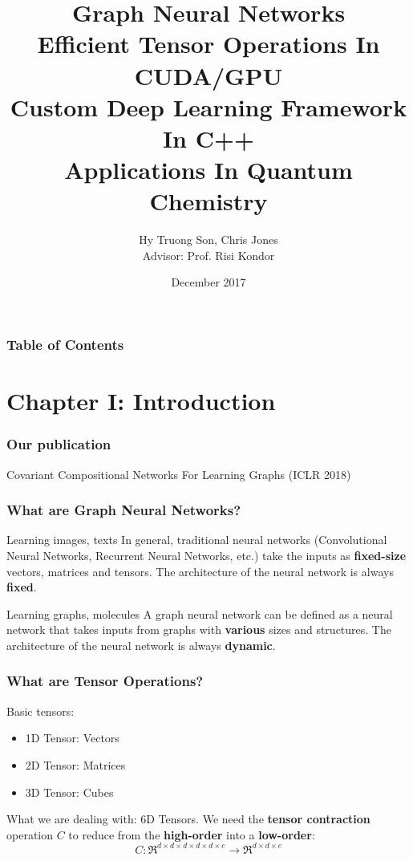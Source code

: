 \documentclass{beamer}
\title[Graph Neural Networks]{Graph Neural Networks \\ Efficient Tensor Operations In CUDA/GPU \\ Custom Deep Learning Framework In C++ \\ Applications In Quantum Chemistry}
\author[Hy et al.]{Hy Truong Son, Chris Jones \\ Advisor: Prof. Risi Kondor}
\institute[UChicago]{The University of Chicago}
\date{December 2017}
\begin{document}

\frame{\titlepage}

\begin{frame}
\frametitle{Table of Contents}
\tableofcontents
\end{frame}

\section{Chapter I: Introduction}

\begin{frame}
\frametitle{Our publication}
Covariant Compositional Networks For Learning Graphs (ICLR 2018)
\end{frame}

\begin{frame}
\frametitle{What are Graph Neural Networks?}
\begin{block}{Learning images, texts}
In general, traditional neural networks (Convolutional Neural Networks, Recurrent Neural Networks, etc.) take the inputs as \textbf{fixed-size} vectors, matrices and tensors. The architecture of the neural network is always \textbf{fixed}.
\end{block}
\begin{alertblock}{Learning graphs, molecules}
A graph neural network can be defined as a neural network that takes inputs from graphs with \textbf{various} sizes and structures. The architecture of the neural network is always \textbf{dynamic}.
\end{alertblock}
\end{frame}

\begin{frame}
\frametitle{What are Tensor Operations?}
Basic tensors:
\begin{itemize}
	\item 1D Tensor: Vectors
	\item 2D Tensor: Matrices
	\item 3D Tensor: Cubes
\end{itemize}
What we are dealing with: {\color{red} 6D Tensors}. We need the \textbf{tensor contraction} operation $C$ to reduce from the \textbf{high-order} into a \textbf{low-order}:
$$C: \Re^{d \times d \times d \times d \times d \times c} \rightarrow \Re^{d \times d \times c}$$
\end{frame}
\end{document}
